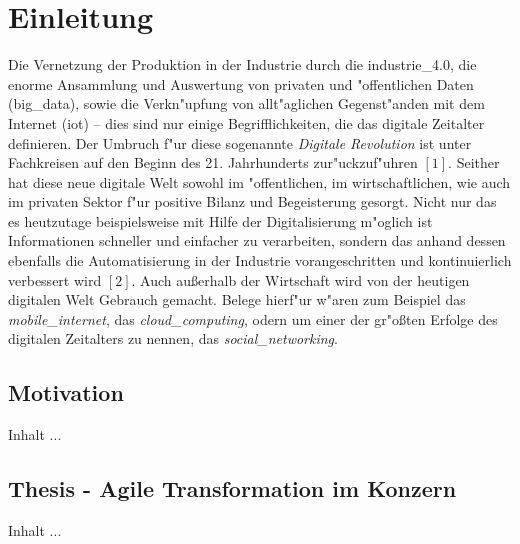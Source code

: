 
\chapter{Einleitung}
\minitoc
\vspace{1 cm} 

Die Vernetzung der Produktion in der Industrie durch die \gls{industrie_4.0}, die enorme 
Ansammlung und Auswertung von privaten und "offentlichen Daten (\gls{big_data}), sowie die 
Verkn"upfung von allt"aglichen Gegenst"anden mit dem Internet (\gls{iot}) -- dies sind nur
 einige Begrifflichkeiten, die das digitale Zeitalter definieren. Der Umbruch f"ur diese 
 sogenannte \textit{Digitale Revolution} ist unter Fachkreisen auf den Beginn des 21. 
 Jahrhunderts zur"uckzuf"uhren \([1]\). Seither hat diese neue digitale Welt sowohl im 
 "offentlichen, im wirtschaftlichen, wie auch im privaten Sektor f"ur positive Bilanz 
 und Begeisterung gesorgt. Nicht nur das es heutzutage beispielsweise mit Hilfe der 
 Digitalisierung m"oglich ist Informationen schneller und einfacher zu verarbeiten, 
 sondern das anhand dessen ebenfalls die Automatisierung in der Industrie vorangeschritten 
 und kontinuierlich verbessert wird \([2]\). Auch au\ss{}erhalb der Wirtschaft wird von der 
 heutigen digitalen Welt Gebrauch gemacht. Belege hierf"ur w"aren zum Beispiel das 
 \textit{\gls{mobile_internet}}, das \textit{\gls{cloud_computing}}, odern um einer der 
 gr"o\ss{}ten Erfolge des digitalen Zeitalters zu nennen, das \textit{\gls{social_networking}}. 


\section{Motivation}
Inhalt ...

\section{Thesis - Agile Transformation im Konzern}
Inhalt ...



